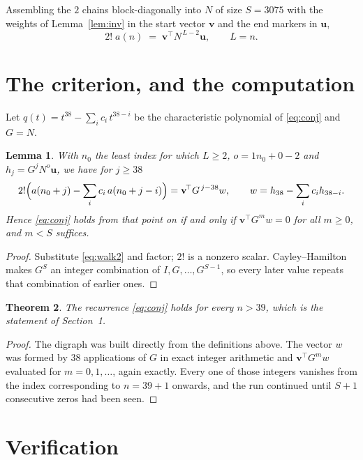 \documentclass[11pt,a4paper]{article}
\theoremstyle{plain}
\newtheorem{theorem}{Theorem}
\newtheorem{lemma}[theorem]{Lemma}
\theoremstyle{definition}
\begin{document}
Assembling the $2$ chains block-diagonally into $N$ of size $S=3075$ with the weights of
Lemma~\ref{lem:inv} in the start vector $\mathbf{v}$ and the end markers in
$\mathbf{u}$,
\begin{equation}\label{eq:walk2}
2!\;a(n)\;=\;\mathbf{v}^{\!\top}N^{\,L-2}\mathbf{u},\qquad L=n .
\end{equation}

\section{The criterion, and the computation}

Let $q(t)=t^{38}-\sum_i c_i\,t^{38-i}$ be the characteristic polynomial of
\eqref{eq:conj} and $G=N$.

\begin{lemma}\label{lem:crit}
With $n_0$ the least index for which $L\ge2$, $o=1n_0+0-2$ and
$h_j=G^{j}N^{o}\mathbf{u}$, we have for $j\ge38$
\[
2!\Bigl(a(n_0+j)-\sum_i c_i\,a(n_0+j-i)\Bigr)=\mathbf{v}^{\!\top}G^{\,j-38}w,
\qquad w=h_{38}-\sum_i c_i h_{38-i} .
\]
Hence \eqref{eq:conj} holds from that point on if and only if
$\mathbf{v}^{\!\top}G^{m}w=0$ for all $m\ge0$, and $m<S$ suffices.
\end{lemma}

\begin{proof}
Substitute \eqref{eq:walk2} and factor; $2!$ is a nonzero scalar. Cayley--Hamilton
makes $G^{S}$ an integer combination of $I,G,\dots,G^{S-1}$, so every later value repeats
that combination of earlier ones.
\end{proof}

\begin{theorem}
The recurrence \eqref{eq:conj} holds for every $n>39$, which is the statement of
Section~1.
\end{theorem}

\begin{proof}
The digraph was built directly from the definitions above. The vector $w$ was formed by
$38$ applications of $G$ in exact integer arithmetic and $\mathbf{v}^{\!\top}G^{m}w$
evaluated for $m=0,1,\dots$, again exactly. Every one of those integers vanishes from the
index corresponding to $n=39+1$ onwards, and the run continued until $S+1$ consecutive
zeros had been seen.
\end{proof}

\section{Verification}
\end{document}
